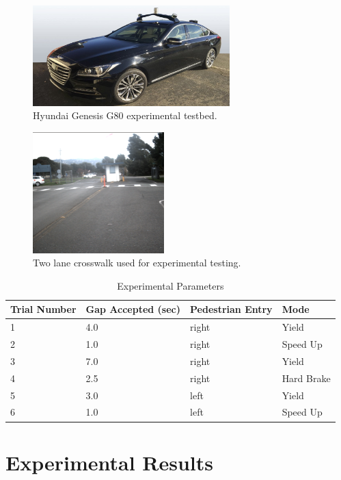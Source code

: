 \documentclass[letterpaper, 10 pt, conference]{ieeeconf} %
\begin{document}
\begin{figure}[h]
\centering
\includegraphics[width=3.0in]{G80.jpg}
\caption{Hyundai Genesis G80 experimental testbed.}
\label{fig:g80}
\end{figure}

\begin{figure}[h]
\centering
\includegraphics[width=2.0in]{crosswalkPic.png}
\caption{Two lane crosswalk used for experimental testing.}
\label{fig:crosswalkpic}
\end{figure}

\begin{table}[h]
\begin{center}
\caption{Experimental Parameters}\label{tb:expparams2}
\begin{tabular}{llll}
Trial Number & Gap Accepted (sec) & Pedestrian Entry & Mode\\\hline\hline
1 & 4.0 & right & Yield\\ 
2 & 1.0 & right & Speed Up\\ 
3 & 7.0 & right & Yield\\ 
4 & 2.5 & right & Hard Brake\\ 
5 & 3.0 & left & Yield \\ 
6 & 1.0 & left & Speed Up\\\hline
\end{tabular}
\end{center}
\end{table}

\section{Experimental Results}
\label{sec:expres}
\end{document}
